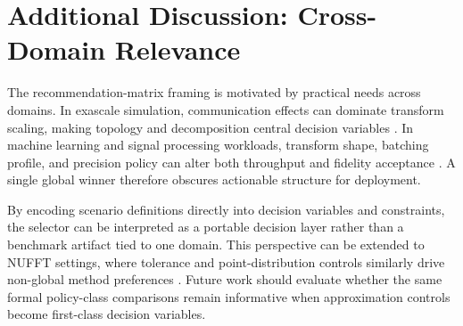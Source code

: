 \documentclass{article} %
\begin{document}
\section{Additional Discussion: Cross-Domain Relevance}
The recommendation-matrix framing is motivated by practical needs across domains. In exascale simulation, communication effects can dominate transform scaling, making topology and decomposition central decision variables \citep{S06,S07,S09,S36,S42}. In machine learning and signal processing workloads, transform shape, batching profile, and precision policy can alter both throughput and fidelity acceptance \citep{S15,S16,S20,S39,S41}. A single global winner therefore obscures actionable structure for deployment.

By encoding scenario definitions directly into decision variables and constraints, the selector can be interpreted as a portable decision layer rather than a benchmark artifact tied to one domain. This perspective can be extended to NUFFT settings, where tolerance and point-distribution controls similarly drive non-global method preferences \citep{S12,S13,S14,S33,S34}. Future work should evaluate whether the same formal policy-class comparisons remain informative when approximation controls become first-class decision variables.
\end{document}
